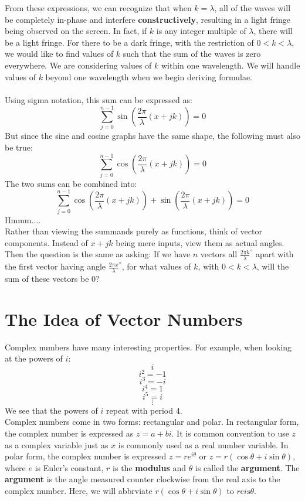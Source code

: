 \documentclass[12pt]{article}
\begin{document}
From these expressions, we can recognize that when $k = \lambda$, all of the waves will be completely in-phase and interfere \textbf{constructively}, resulting in a light fringe being
observed on the screen. 
\newpage
In fact, if $k$ is any integer multiple of $\lambda$, there will be a light fringe.
For there to be a dark fringe, with the restriction of $0<k < \lambda$, we would like to find values of
$k$ such that the sum of the waves is zero everywhere. We are considering values of $k$ within one wavelength. We will handle values of $k$ beyond one wavelength 
when we begin deriving formulae. 
\\
\\
Using sigma notation, this sum can be expressed as:
\begin{equation}
  \label{eqn:1}
  \sum_{j=0}^{n-1} \sin(\frac{2\pi}{\lambda}(x+jk)) = 0
  \end{equation}
But since the sine and cosine graphs have the same shape, the following must also be true:
\begin{equation}
  \label{eqn:2}
  \sum_{j=0}^{n-1} \cos(\frac{2\pi}{\lambda}(x+jk)) = 0
  \end{equation}
The two sums can be combined into:
\begin{equation}
  \label{eqn:3}
  \sum_{j=0}^{n-1} \cos(\frac{2\pi}{\lambda}(x+jk)) + \sin(\frac{2\pi}{\lambda}(x+jk)) = 0
  \end{equation}
Hmmm....
\\Rather than viewing the summands purely as functions, think of vector components. Instead of $x+jk$ being mere inputs, view them as actual angles.
Then the question is the same as asking: If we have $n$ vectors all $\frac{2\pi k}{\lambda}^\circ$ apart with the first vector having angle $\frac{2\pi x}{\lambda}^\circ$,
for what values of $k$, with $0<k<\lambda$, will the sum of these vectors be 0? 
\newpage
\section{The Idea of Vector Numbers}
Complex numbers have many interesting properties. For example, when looking at the powers of $i$:
$$i$$
$$i^2 = -1$$ 
$$i^3 = -i$$
$$i^4 = 1$$
$$i^5 = i$$
$$\vdots$$
We see that the powers of $i$ repeat with period 4. 
\\

Complex numbers come in two forms: rectangular and polar. 
In rectangular form, the complex number is expressed as $z = a + bi$. It is common convention to use $z$ as a complex variable just as 
$x$ is commonly used as a real number variable. In polar form, the complex number is expressed
$z = re^{i\theta}$ or $z = r(\cos\theta + i\sin \theta)$, where $e$ is Euler's constant, $r$ is the \textbf{modulus} and $\theta$ is called the \textbf{argument}. The \textbf{argument} is the angle measured counter clockwise from the real axis 
to the complex number. Here, we will abbrviate $r(\cos\theta + i\sin \theta)$ to $r\text{c}i\text{s}\theta$. 
\end{document}

